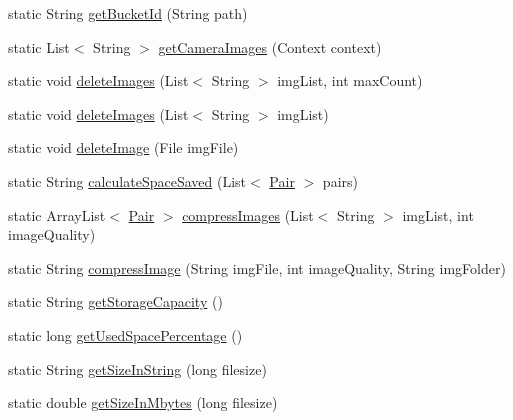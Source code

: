 \begin{DoxyCompactItemize}
\item 
static String \hyperlink{classcourse_1_1examples_1_1spacesaver_1_1_utility_afb38a3ff9ea902240c74adad9d975b80}{get\+Bucket\+Id} (String path)
\item 
static List$<$ String $>$ \hyperlink{classcourse_1_1examples_1_1spacesaver_1_1_utility_a7d516823eb324565737ea69a39e604f9}{get\+Camera\+Images} (Context context)
\item 
static void \hyperlink{classcourse_1_1examples_1_1spacesaver_1_1_utility_a534b914baf6a7ef4d7f681a7d56e4da6}{delete\+Images} (List$<$ String $>$ img\+List, int max\+Count)
\item 
static void \hyperlink{classcourse_1_1examples_1_1spacesaver_1_1_utility_a0b699bacd4fbbf65e427f211fc25a02b}{delete\+Images} (List$<$ String $>$ img\+List)
\item 
static void \hyperlink{classcourse_1_1examples_1_1spacesaver_1_1_utility_a410f3b952b4a853e0925dd816cf34237}{delete\+Image} (File img\+File)
\item 
static String \hyperlink{classcourse_1_1examples_1_1spacesaver_1_1_utility_a6e99256bde02985ef71df62265c56217}{calculate\+Space\+Saved} (List$<$ \hyperlink{classcourse_1_1examples_1_1spacesaver_1_1_pair}{Pair} $>$ pairs)
\item 
static Array\+List$<$ \hyperlink{classcourse_1_1examples_1_1spacesaver_1_1_pair}{Pair} $>$ \hyperlink{classcourse_1_1examples_1_1spacesaver_1_1_utility_a5029adf50e50346e2bb08bb1557ed064}{compress\+Images} (List$<$ String $>$ img\+List, int image\+Quality)
\item 
static String \hyperlink{classcourse_1_1examples_1_1spacesaver_1_1_utility_a8f1697a3c166596b60f83c21d23162fb}{compress\+Image} (String img\+File, int image\+Quality, String img\+Folder)
\item 
static String \hyperlink{classcourse_1_1examples_1_1spacesaver_1_1_utility_a52b2d0846affd9ee60328055d871f4df}{get\+Storage\+Capacity} ()
\item 
static long \hyperlink{classcourse_1_1examples_1_1spacesaver_1_1_utility_ad042fcb059f4401bc0a278735db91646}{get\+Used\+Space\+Percentage} ()
\item 
static String \hyperlink{classcourse_1_1examples_1_1spacesaver_1_1_utility_aba39539a00ba3e4d7c74198092926dee}{get\+Size\+In\+String} (long filesize)
\item 
static double \hyperlink{classcourse_1_1examples_1_1spacesaver_1_1_utility_a151cd0a1aae29fb3efdf0af4ed402673}{get\+Size\+In\+Mbytes} (long filesize)
\end{DoxyCompactItemize}
